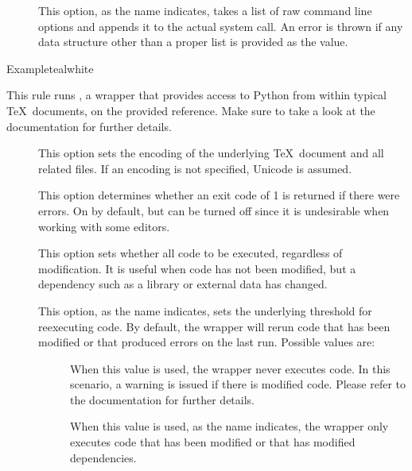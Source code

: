 \begin{description}
\begin{description}
\item[] This option, as the name indicates, takes a list of raw command line options and appends it to the actual system call. An error is thrown if any data structure other than a proper list is provided as the value.
\end{description}

\begin{codebox}{Example}{teal}{\icnote}{white}
\end{codebox}

\item[\rulebox{pythontex}]
This rule runs , a wrapper that provides access to Python from within typical \TeX\ documents, on the provided  reference. Make sure to take a look at the documentation for further details.

\begin{description}
\item[] This option sets the encoding of the underlying \TeX\ document and all related files. If an encoding is not specified, Unicode is assumed.

\item[] This option determines whether an exit code of 1 is returned if there were errors. On by default, but can be turned off since it is undesirable when working with some editors.

\item[] This option sets whether all code to be executed, regardless of modification. It is useful when code has not been modified, but a dependency such as a library or external data has changed.

\item[] This option, as the name indicates, sets the underlying threshold for reexecuting code. By default, the wrapper will rerun code that has been modified or that produced errors  on the last run. Possible values are:

\begin{description}
\item[] When this value is used, the wrapper never executes code. In this scenario, a warning is issued if there is modified code. Please refer to the documentation for further details.

\item[] When this value is used, as the name indicates, the wrapper only executes code that has been modified or that has modified dependencies.


\end{description}
\end{description}
\end{description}
